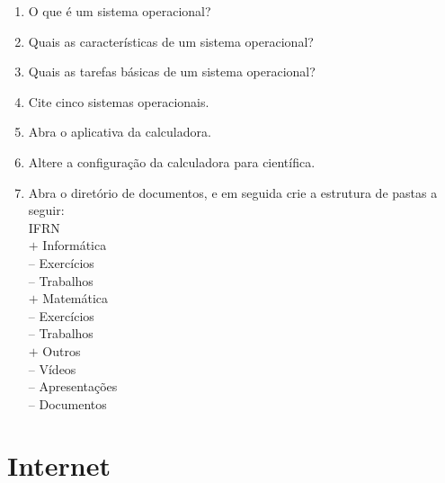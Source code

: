 \documentclass[11pt]{article}
\begin{document}
		\begin{enumerate}
			\item O que é um sistema operacional?
			\item Quais as características de um sistema operacional?
			\item Quais as tarefas básicas de um sistema operacional?
			\item Cite cinco sistemas operacionais.
			\item	Abra o aplicativa da calculadora.
			\item Altere a configura\c cão da calculadora para científica.
			\item Abra o diretório de documentos, e em seguida crie a estrutura de pastas a seguir:\\
IFRN\\
$+$ Informática\\
-- Exercícios\\
-- Trabalhos\\
$+$ Matemática\\
-- Exercícios\\
-- Trabalhos\\
$+$ Outros\\
-- Vídeos\\
-- Apresentações\\
-- Documentos\\
	\end{enumerate}
		
	\newpage
	\section{Internet}
	
\end{document}
